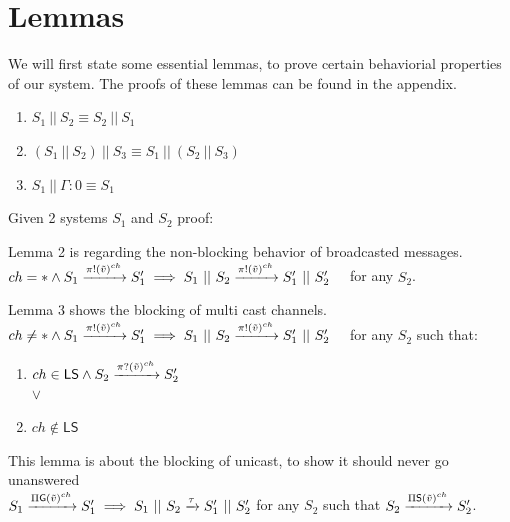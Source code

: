 \section{Lemmas}
We will first state some essential lemmas, to prove certain behaviorial properties of our system. The proofs of these lemmas can be found in the appendix.\\
\begin{lemma}
    \begin{enumerate}
    \item $S_1 \ || \ S_2 \equiv S_2\ ||\ S_1$
    \item $(S_1 \ ||\ S_2 )\ || \ S_3 \equiv S_1 \ ||\ (S_2 \ || \ S_3)$
    \item $S_1 \ || \ \Gamma : 0 \equiv S_1$
\end{enumerate}
\end{lemma}
Given 2 systems $S_1$ and $S_2$ proof:
\begin{lemma}
Lemma 2 is regarding the non-blocking behavior of broadcasted messages.\\ 
$ch=* \land S_1 \xrightarrow[]{\pi !(\Tilde{v})^{ch}}S_1' \implies S_1\ ||\ S_2 \xrightarrow[]{\pi !(\Tilde{v})^{ch}}S_1'\ ||\ S_2'\quad $ for any $S_2$.\\
\end{lemma}
\begin{lemma}
    Lemma 3 shows the blocking of multi cast channels.\\
$ch\not = * \land S_1 \xrightarrow[]{\pi !(\Tilde{v})^{ch}}S_1' \implies S_1\ ||\ S_2 \xrightarrow[]{\pi !(\Tilde{v})^{ch}}S_1'\ ||\ S_2'\quad$ for any $S_2$ such that:
\begin{enumerate}
    \item $ch \in \mathsf{LS} \land S_2 \xrightarrow[]{\pi ?(\Tilde{v})^{ch}}S_2'$\\
    $\lor$
    \item $ch \not \in \mathsf{LS}$
\end{enumerate}
\end{lemma}
\begin{lemma}
    This lemma is about the blocking of unicast, to show it should never go unanswered\\
$S_1 \xrightarrow[]{\Pi \mathsf{G} (\Tilde{v})^{ch}} S_1' \implies S_1 \ || \ S_2 \xrightarrow[]{\tau} S_1' \ || \ S_2'$ for any $S_2$ such that $S_2 \xrightarrow[]{\Pi \mathsf{S} (\Tilde{v})^{ch}} S_2'$. 
\end{lemma}
